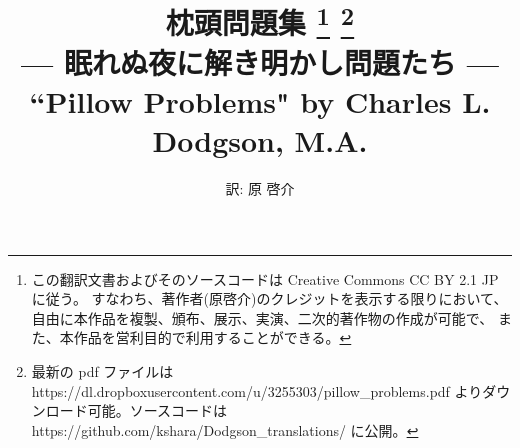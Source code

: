\documentclass{book}
\begin{document}
\title{枕頭問題集
    \footnote{この翻訳文書およびそのソースコードは
    Creative Commons CC BY 2.1 JP に従う。
    すなわち、著作者(原啓介)のクレジットを表示する限りにおいて、
    自由に本作品を複製、頒布、展示、実演、二次的著作物の作成が可能で、
    また、本作品を営利目的で利用することができる。}
    \footnote{最新の pdf ファイルは https://dl.dropboxusercontent.com/u/3255303/pillow\_problems.pdf よりダウンロード可能。ソースコードは
        https://github.com/kshara/Dodgson\_translations/
    に公開。}
    \\
    {\normalsize --- 眠れぬ夜に解き明かし問題たち ---}
    \\
    ``Pillow Problems" by Charles L. Dodgson, M.A.
}
\author{訳: 原 啓介}

\maketitle

\tableofcontents






\end{document}
